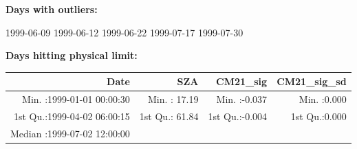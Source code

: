 \documentclass[
  10pt,
  a4paper,oneside]{article}
\begin{document}
\normalsize

\textbf{Days with outliers:}

1999-06-09 1999-06-12 1999-06-22 1999-07-17 1999-07-30

\textbf{Days hitting physical limit:}

\footnotesize

\begin{longtable}[]{@{}rrrr@{}}
\toprule
\begin{minipage}[b]{0.33\columnwidth}\raggedleft
Date\strut
\end{minipage} & \begin{minipage}[b]{0.19\columnwidth}\raggedleft
SZA\strut
\end{minipage} & \begin{minipage}[b]{0.19\columnwidth}\raggedleft
CM21\_sig\strut
\end{minipage} & \begin{minipage}[b]{0.19\columnwidth}\raggedleft
CM21\_sig\_sd\strut
\end{minipage}\tabularnewline
\midrule
\endhead
\begin{minipage}[t]{0.33\columnwidth}\raggedleft
Min. :1999-01-01 00:00:30\strut
\end{minipage} & \begin{minipage}[t]{0.19\columnwidth}\raggedleft
Min. : 17.19\strut
\end{minipage} & \begin{minipage}[t]{0.19\columnwidth}\raggedleft
Min. :-0.037\strut
\end{minipage} & \begin{minipage}[t]{0.19\columnwidth}\raggedleft
Min. :0.000\strut
\end{minipage}\tabularnewline
\begin{minipage}[t]{0.33\columnwidth}\raggedleft
1st Qu.:1999-04-02 06:00:15\strut
\end{minipage} & \begin{minipage}[t]{0.19\columnwidth}\raggedleft
1st Qu.: 61.84\strut
\end{minipage} & \begin{minipage}[t]{0.19\columnwidth}\raggedleft
1st Qu.:-0.004\strut
\end{minipage} & \begin{minipage}[t]{0.19\columnwidth}\raggedleft
1st Qu.:0.000\strut
\end{minipage}\tabularnewline
\begin{minipage}[t]{0.33\columnwidth}\raggedleft
Median :1999-07-02 12:00:00\strut

\end{minipage}
\end{longtable}
\end{document}
